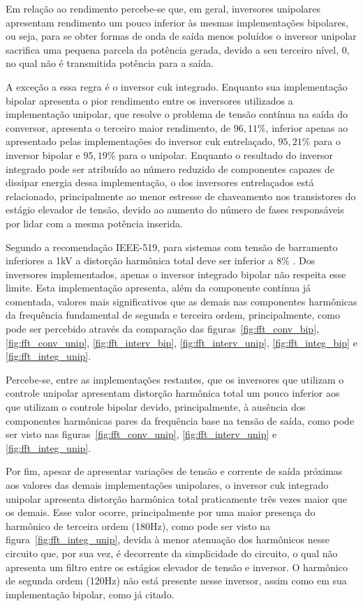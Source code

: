 \documentclass[
	12pt,				%
	openright,			%
	twoside,			%
	a4paper,			%
	english,			%
	french,				%
	spanish,			%
	brazil,				%
	]{abntex2}
\begin{document}
Em relação ao rendimento percebe-se que, em geral, inversores unipolares apresentam rendimento um pouco inferior às mesmas implementações bipolares, ou seja, para se obter formas de onda de saída menos poluídos o inversor unipolar sacrifica uma pequena parcela da potência gerada, devido a seu terceiro nível, 0, no qual não é transmitida potência para a saída.

A exceção a essa regra é o inversor cuk integrado. Enquanto sua implementação bipolar apresenta o pior rendimento entre os inversores utilizados a implementação unipolar, que resolve o problema de tensão contínua na saída do conversor, apresenta o terceiro maior rendimento, de $96,11\%$, inferior apenas ao apresentado pelas implementações do inversor cuk entrelaçado, $95,21\%$ para o inversor bipolar e $95,19\%$ para o unipolar. Enquanto o resultado do inversor integrado pode ser atribuído ao número reduzido de componentes capazes de dissipar energia dessa implementação, o dos inversores entrelaçados está relacionado, principalmente ao menor estresse de chaveamento nos transistores do estágio elevador de tensão, devido ao aumento do número de fases responsáveis por lidar com a mesma potência inserida.

Segundo a recomendação IEEE-519, para sistemas com tensão de barramento inferiores a 1kV a distorção harmônica total deve ser inferior a $8\%$ \cite{IEEE_519}. Dos inversores implementados, apenas o inversor integrado bipolar não respeita esse limite. Esta implementação apresenta, além da componente contínua já comentada, valores mais significativos que as demais nas componentes harmônicas da frequência fundamental de segunda e terceira ordem, principalmente, como pode ser percebido através da comparação das figuras~\ref{fig:fft_conv_bip}, \ref{fig:fft_conv_unip}, \ref{fig:fft_interv_bip}, \ref{fig:fft_interv_unip}, \ref{fig:fft_integ_bip} e \ref{fig:fft_integ_unip}. 

Percebe-se, entre as implementações restantes, que os inversores que utilizam o controle unipolar apresentam distorção harmônica total um pouco inferior aos que utilizam o controle bipolar devido, principalmente, à ausência dos componentes harmônicas pares da frequência base na tensão de saída, como pode ser visto nas figuras~\ref{fig:fft_conv_unip}, \ref{fig:fft_interv_unip} e \ref{fig:fft_integ_unip}.

Por fim, apesar de apresentar variações de tensão e corrente de saída próximas aos valores das demais implementações unipolares, o inversor cuk integrado unipolar apresenta distorção harmônica total praticamente três vezes maior que os demais. Esse valor ocorre, principalmente por uma maior presença do harmônico de terceira ordem (180Hz), como pode ser visto na figura~\ref{fig:fft_integ_unip}, devida à menor atenuação dos harmônicos nesse circuito que, por sua vez, é decorrente da simplicidade do circuito, o qual não apresenta um filtro entre os estágios elevador de tensão e inversor. O harmônico de segunda ordem (120Hz) não está presente nesse inversor, assim como em sua implementação bipolar, como já citado.
\end{document}
